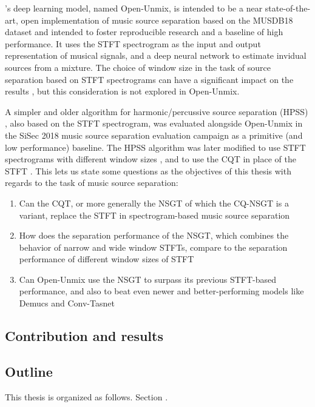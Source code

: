 \documentclass[letter,12pt,notitlepage]{article}
\begin{document}
\citet{umx}'s deep learning model, named Open-Unmix, is intended to be a near state-of-the-art, open implementation of music source separation based on the MUSDB18 dataset \cite{musdb18} and intended to foster reproducible research and a baseline of high performance. It uses the STFT spectrogram as the input and output representation of musical signals, and a deep neural network to estimate invidual sources from a mixture. The choice of window size in the task of source separation based on STFT spectrograms can have a significant impact on the results \cite{musicsepwindow}, but this consideration is not explored in Open-Unmix.

A simpler and older algorithm for harmonic/percussive source separation (HPSS) \cite{fitzgerald1}, also based on the STFT spectrogram, was evaluated alongside Open-Unmix in the SiSec 2018 music source separation evaluation campaign \cite{sisec2018} as a primitive (and low performance) baseline. The HPSS algorithm was later modified to use STFT spectrograms with different window sizes \cite{driedger, fitzgerald2}, and to use the CQT in place of the STFT \cite{fitzgerald2}. This lets us state some questions as the objectives of this thesis with regards to the task of music source separation:

\begin{enumerate}
	\item
		Can the CQT, or more generally the NSGT of which the CQ-NSGT is a variant, replace the STFT in spectrogram-based music source separation
	\item
		How does the separation performance of the NSGT, which combines the behavior of narrow and wide window STFTs, compare to the separation performance of different window sizes of STFT
	\item
		Can Open-Unmix use the NSGT to surpass its previous STFT-based performance, and also to beat even newer and better-performing models like Demucs and Conv-Tasnet \cite{demucs}
\end{enumerate}

\subsection{Contribution and results}

\subsection{Outline}

This thesis is organized as follows. Section .
\end{document}
